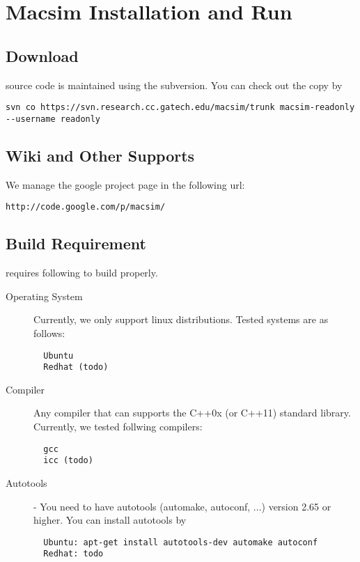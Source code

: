 
\clearpage
\section{Macsim Installation and Run}

\subsection{Download}

\SIM source code is maintained using the subversion. 
You can check out the \SIM copy by

\smallskip
\begin{lstlisting}
svn co https://svn.research.cc.gatech.edu/macsim/trunk macsim-readonly --username readonly
\end{lstlisting}
\smallskip


\subsection{Wiki and Other Supports}

We manage the google project page in the following url:

\smallskip
\begin{lstlisting}
http://code.google.com/p/macsim/
\end{lstlisting}
\smallskip


\subsection{Build Requirement}

\SIM requires following to build properly.

\begin{description}

  \item[Operating System] Currently, we only support linux
  distributions. Tested systems are as follows:

  \smallskip
  \begin{lstlisting}
  Ubuntu
  Redhat (todo)
  \end{lstlisting}
  \smallskip

  \item[Compiler] Any compiler that can supports the C++0x (or C++11)
  standard library. Currently, we tested follwing compilers:
        
  \smallskip 
  \begin{lstlisting}
  gcc   
  icc (todo)
  \end{lstlisting} 
  \smallskip

  \item[Autotools] - You need to have autotools (automake, autoconf,
  ...) version 2.65 or higher. You can install autotools by

  \smallskip
  \begin{lstlisting}
  Ubuntu: apt-get install autotools-dev automake autoconf
  Redhat: todo
  \end{lstlisting}
  \smallskip


\end{description}

